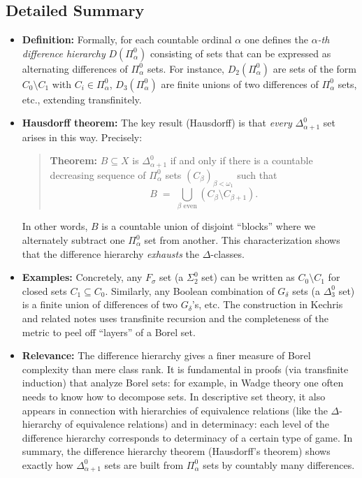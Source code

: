 \documentclass[11pt]{article}
\begin{document}
\subsection{Detailed Summary}
\label{detailed-summary-6}
\begin{itemize}
\item \textbf{Definition:} Formally, for each countable ordinal \(\alpha\) one
defines the \emph{\(\alpha\)-th difference hierarchy} \(D(\Pi^0_\alpha)\)
consisting of sets that can be expressed as alternating differences of
\(\Pi^0_\alpha\) sets. For instance, \(D_2(\Pi^0_\alpha)\) are sets of
the form \(C_0\setminus C_1\) with \(C_i\in\Pi^0_\alpha\),
\(D_3(\Pi^0_\alpha)\) are finite unions of two differences of
\(\Pi^0_\alpha\) sets, etc., extending transfinitely.

\item \textbf{Hausdorff theorem:} The key result (Hausdorff) is that \emph{every}
\(\Delta^0_{\alpha+1}\) set arises in this way. Precisely:

\begin{quote}
\textbf{Theorem:} \(B\subseteq X\) is \(\Delta^0_{\alpha+1}\) if and only if
there is a countable decreasing sequence of \(\Pi^0_\alpha\) sets
\((C_\beta)_{\beta<\omega_1}\) such that
\[B \;=\; \bigcup_{\beta\text{ even}} (C_\beta \setminus C_{\beta+1}).\]
\end{quote}

In other words, \(B\) is a countable union of disjoint “blocks” where
we alternately subtract one \(\Pi^0_\alpha\) set from another. This
characterization shows that the difference hierarchy \emph{exhausts} the
\(\Delta\)-classes.

\item \textbf{Examples:} Concretely, any \(F_\sigma\) set (a \(\Sigma^0_2\) set)
can be written as \(C_0\setminus C_1\) for closed sets
\(C_1\subseteq C_0\). Similarly, any Boolean combination of
\(G_\delta\) sets (a \(\Delta^0_3\) set) is a finite union of
differences of two \(G_\delta\)'s, etc. The construction in Kechris
and related notes uses transfinite recursion and the completeness of
the metric to peel off “layers” of a Borel set.

\item \textbf{Relevance:} The difference hierarchy gives a finer measure of Borel
complexity than mere class rank. It is fundamental in proofs (via
transfinite induction) that analyze Borel sets: for example, in Wadge
theory one often needs to know how to decompose sets. In descriptive
set theory, it also appears in connection with hierarchies of
equivalence relations (like the \(\Delta\)-hierarchy of equivalence
relations) and in determinacy: each level of the difference hierarchy
corresponds to determinacy of a certain type of game. In summary, the
difference hierarchy theorem (Hausdorff's theorem) shows exactly how
\(\Delta^0_{\alpha+1}\) sets are built from \(\Pi^0_\alpha\) sets by
countably many differences.
\end{itemize}
\end{document}
